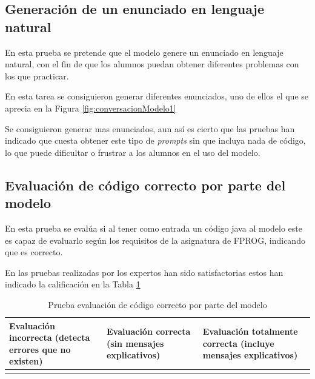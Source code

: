 \subsection{Generación de un enunciado en lenguaje natural}
\label{generacion_enunciado}
En esta prueba se pretende que el modelo genere un enunciado en lenguaje natural, con el fin de que los alumnos puedan obtener diferentes problemas con los que practicar.

En esta tarea se consiguieron generar diferentes enunciados, uno de ellos el que se aprecia en la Figura \ref{fig:conversacionModelo1}


Se consiguieron generar mas enunciados, aun así es cierto que las pruebas han indicado que cuesta obtener este tipo de \textit{prompts} sin que incluya nada de código, lo que puede dificultar o frustrar a los alumnos en el uso del modelo.

\subsection{Evaluación de código correcto por parte del modelo}

En esta prueba se evalúa si al tener como entrada un código java al modelo este es capaz de evaluarlo según los requisitos de la asignatura de FPROG, indicando  que es correcto.

En las pruebas realizadas por los expertos han sido satisfactorias estos han indicado la calificación en la Tabla \ref{tabla:evaluacion-ej2}

\begin{table}[htb]
    \centering
    \begin{tabular}{| >{\arraybackslash}m{}| >{\arraybackslash}m{} | >{\arraybackslash}m{}|} \hline
    \vspace{0.5em}  Evaluación incorrecta (detecta errores que no existen) \vspace{0.5em} &  Evaluación correcta (sin mensajes explicativos) & Evaluación totalmente correcta (incluye mensajes explicativos) \\ \hline
     &  & \multicolumn{1}{|c|}{X} \\ \hline 
    \end{tabular}\caption{Prueba evaluación de código correcto por parte del modelo}
    \label{tabla:evaluacion-ej2}
\end{table}

